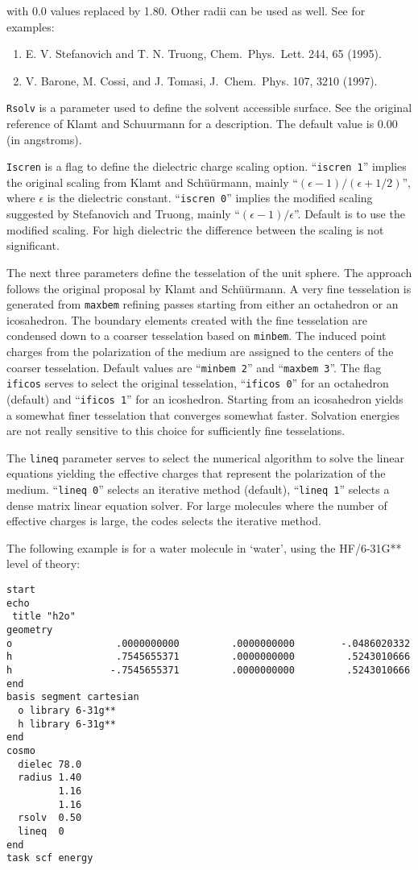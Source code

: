 with 0.0 values replaced by 1.80. Other radii can be used as well.
See for examples:

\begin{enumerate}
\item E. V. Stefanovich and T. N. Truong, Chem.~Phys.~Lett. 244, 65 (1995).
\item V. Barone, M. Cossi, and J. Tomasi, J.~Chem.~Phys. 107, 3210 (1997).
\end{enumerate}

\verb+Rsolv+ is a parameter used to define the solvent accessible
surface. See the original reference of Klamt and Schuurmann for a
description. The default value is 0.00 (in angstroms).

\verb+Iscren+ is a flag to define the dielectric charge scaling option.
``{\tt iscren 1}'' implies the original scaling from Klamt and Sch\"{u}\"{u}rmann,
mainly ``$(\epsilon-1)/(\epsilon+1/2)$'', where $\epsilon$ is the dielectric constant.
``{\tt iscren 0}'' implies the modified scaling suggested by Stefanovich and
Truong, mainly ``$(\epsilon-1)/\epsilon$''. Default is to use the modified scaling.
For high dielectric the difference between the scaling is not 
significant.

The next three parameters define the tesselation of the unit sphere.
The approach follows the original proposal by Klamt and Sch\"{u}\"{u}rmann.
A very fine tesselation is generated from \verb+maxbem+ refining 
passes starting from either an octahedron or an icosahedron. The
boundary elements created with the fine tesselation are condensed
down to a coarser tesselation based on \verb+minbem+. The induced
point charges from the polarization of the medium are assigned to
the centers of the coarser tesselation. Default values are
``{\tt minbem 2}'' and ``{\tt maxbem 3}''. The flag \verb+ificos+ serves to
select the original tesselation, ``{\tt ificos 0}'' for an octahedron
(default) and ``{\tt ificos 1}'' for an icoshedron. Starting from an icosahedron
yields a somewhat finer tesselation that converges somewhat faster.
Solvation energies are not really sensitive to this choice for
sufficiently fine tesselations.

The \verb+lineq+ parameter serves to select the numerical algorithm to solve
the linear equations yielding the effective charges that represent
the polarization of the medium. ``{\tt lineq 0}'' selects an iterative method 
(default), ``{\tt lineq 1}'' selects a dense matrix linear equation solver.
For large molecules where the number of effective charges is large,
the codes selects the iterative method.

The following example is for a water molecule in `water', using
the HF/6-31G** level of theory:

\begin{verbatim}
start
echo
 title "h2o"
geometry
o                  .0000000000         .0000000000        -.0486020332
h                  .7545655371         .0000000000         .5243010666
h                 -.7545655371         .0000000000         .5243010666
end
basis segment cartesian
  o library 6-31g**
  h library 6-31g**
end
cosmo
  dielec 78.0
  radius 1.40
         1.16
         1.16
  rsolv  0.50
  lineq  0
end
task scf energy
\end{verbatim}
